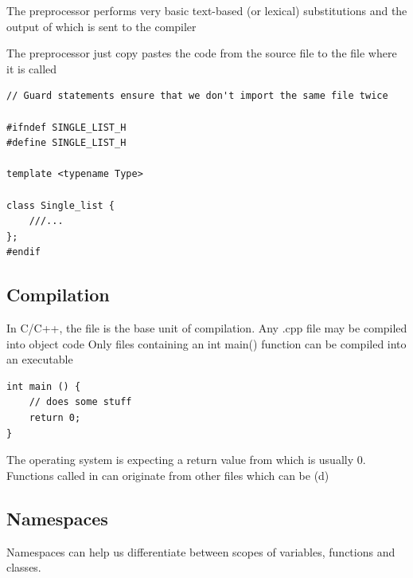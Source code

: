 \documentclass[11pt]{article}
\theoremstyle{definition}
\begin{document}
The preprocessor performs very basic text-based (or lexical) substitutions and the output of which is sent to the compiler

The preprocessor just copy pastes the code from the source file to the file where it is called
\begin{lstlisting}
// Guard statements ensure that we don't import the same file twice

#ifndef SINGLE_LIST_H
#define SINGLE_LIST_H

template <typename Type>

class Single_list {
	///...
};
#endif
\end{lstlisting}
\subsection{Compilation}
In C/C++, the file is the base unit of compilation. Any .cpp file may be compiled into object code
Only files containing an int main() function can be compiled into an executable
\begin{lstlisting}
int main () {
    // does some stuff
    return 0;
}
\end{lstlisting}
The operating system is expecting a return value from  which is usually 0. Functions called in  can originate from other files which can be (d)
\newpage
\subsection{Namespaces}
Namespaces can help us differentiate between scopes of variables, functions and classes. 
\end{document}
